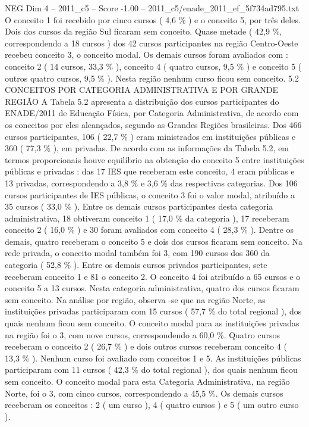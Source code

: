 \begin{textsample}{NEG Dim 4 – 2011\_c5 – Score -1.00 – 2011\_c5/enade\_2011\_ef\_5f734ad795.txt}
O conceito 1 foi recebido por cinco cursos ( 4,6 \% ) e o conceito 5, por três deles.
Dois dos cursos da região Sul ficaram sem conceito.
Quase metade ( 42,9 \%, correspondendo a 18 cursos ) dos 42 cursos participantes na região Centro-Oeste recebeu conceito 3, o conceito modal.
Os demais cursos foram avaliados com : conceito 2 ( 14 cursos, 33,3 \% ), conceito 4 ( quatro cursos, 9,5 \% ) e conceito 5 ( outros quatro cursos, 9,5 \% ).
Nesta região nenhum curso ficou sem conceito. 5.2 CONCEITOS POR CATEGORIA ADMINISTRATIVA E POR GRANDE REGIÃO A Tabela 5.2 apresenta a distribuição dos cursos participantes do ENADE/2011 de Educação Física, por Categoria Administrativa, de acordo com os conceitos por eles alcançados, segundo as Grandes Regiões brasileiras.
Dos 466 cursos participantes, 106 ( 22,7 \% ) eram ministrados em instituições públicas e 360 ( 77,3 \% ), em privadas.
De acordo com as informações da Tabela 5.2, em termos proporcionais houve equilíbrio na obtenção do conceito 5 entre instituições públicas e privadas : das 17 IES que receberam este conceito, 4 eram públicas e 13 privadas, correspondendo a 3,8 \% e 3,6 \% das respectivas categorias.
Dos 106 cursos participantes de IES públicas, o conceito 3 foi o valor modal, atribuído a 35 cursos ( 33,0 \% ).
Entre os demais cursos participantes desta categoria administrativa, 18 obtiveram conceito 1 ( 17,0 \% da categoria ), 17 receberam conceito 2 ( 16,0 \% ) e 30 foram avaliados com conceito 4 ( 28,3 \% ).
Dentre os demais, quatro receberam o conceito 5 e dois dos cursos ficaram sem conceito.
Na rede privada, o conceito modal também foi 3, com 190 cursos dos 360 da categoria ( 52,8 \% ).
Entre os demais cursos privados participantes, sete receberam conceito 1 e 81 o conceito 2.
O conceito 4 foi atribuído a 65 cursos e o conceito 5 a 13 cursos.
Nesta categoria administrativa, quatro dos cursos ficaram sem conceito.
Na análise por região, observa -se que na região Norte, as instituições privadas participaram com 15 cursos ( 57,7 \% do total regional ), dos quais nenhum ficou sem conceito.
O conceito modal para as instituições privadas na região foi o 3, com nove cursos, correspondendo a 60,0 \%.
Quatro cursos receberam o conceito 2 ( 26,7 \% ) e dois outros cursos receberam conceito 4 ( 13,3 \% ).
Nenhum curso foi avaliado com conceitos 1 e 5.
As instituições públicas participaram com 11 cursos ( 42,3 \% do total regional ), dos quais nenhum ficou sem conceito.
O conceito modal para esta Categoria Administrativa, na região Norte, foi o 3, com cinco cursos, correspondendo a 45,5 \%.
Os demais cursos receberam os conceitos : 2 ( um curso ), 4 ( quatro cursos ) e 5 ( um outro curso ).

\end{textsample}
